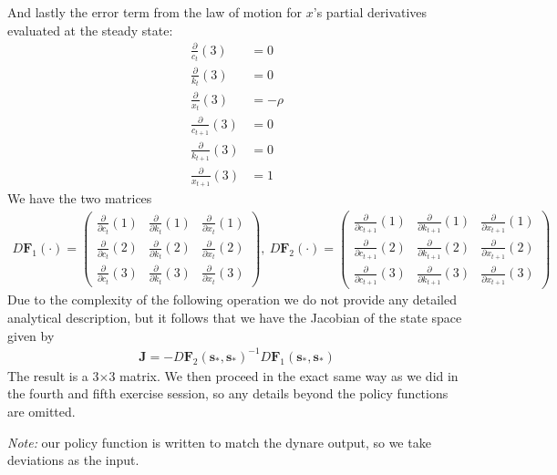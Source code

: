 \documentclass[a4paper]{article}
\theoremstyle{definition}
\begin{document}
And lastly the error term from the law of motion for $x$'s partial derivatives evaluated at the steady state:
	\begin{align*}
	\frac{\partial}{c_{t}}(3) 		&= 0 \\
	\frac{\partial}{k_{t}}(3) 		&= 0 \\
	\frac{\partial}{x_{t}}(3) 		&= -\rho \\
	\frac{\partial}{c_{t+1}}(3) 	&= 0 \\			
	\frac{\partial}{k_{t+1}}(3) 	&= 0 \\
	\frac{\partial}{x_{t+1}}(3) 	&= 1
	\end{align*}
We have the two matrices
	\begin{align*}
	D \mathbf F_1(\cdot) = \begin{pmatrix} \frac{\partial}{\partial c_{t}}(1) & \frac{\partial}{\partial k_t}(1) & \frac{\partial}{\partial x_t}(1) \\ \frac{\partial}{\partial c_{t}}(2) & \frac{\partial}{\partial k_t}(2) & \frac{\partial}{\partial x_t}(2) \\ \frac{\partial}{\partial c_{t}}(3) & \frac{\partial}{\partial k_t}(3) & \frac{\partial}{\partial x_t}(3)  \end{pmatrix},\
	D \mathbf F_2(\cdot) = \begin{pmatrix} \frac{\partial}{\partial c_{t+1}}(1) & \frac{\partial}{\partial k_{t+1}}(1) & \frac{\partial}{\partial x_{t+1}}(1) \\ \frac{\partial}{\partial c_{t+1}}(2) & \frac{\partial}{\partial k_{t+1}}(2) & \frac{\partial}{\partial x_{t+1}}(2) \\ \frac{\partial}{\partial c_{t+1}}(3) & \frac{\partial}{\partial k_{t+1}}(3) & \frac{\partial}{\partial x_{t+1}}(3)  \end{pmatrix}
	\end{align*}
Due to the complexity of the following operation we do not provide any detailed analytical description, but it follows that we have the Jacobian of the state space given by
	\begin{align*}
	\mathbf J = - D \mathbf F_2(\mathbf s_*,\mathbf s_*)^{-1} D \mathbf F_1(\mathbf s_*,\mathbf s_*)
	\end{align*}
The result is a 3$\times$3 matrix. We then proceed in the exact same way as we did in the fourth and fifth exercise session, so any details beyond the policy functions are omitted. 

\textit{Note:} our policy function is written to match the dynare output, so we take deviations as the input.
	
\end{document}
